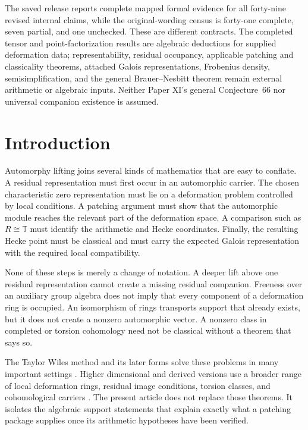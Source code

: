\documentclass[11pt]{amsart}
\theoremstyle{definition}
\theoremstyle{remark}
\newcommand{\TT}{\mathbb T}
\begin{document}
The saved release reports complete mapped formal evidence for all forty-nine revised internal claims, while the original-wording census is forty-one complete, seven partial, and one unchecked. These are different contracts. The completed tensor and point-factorization results are algebraic deductions for supplied deformation data; representability, residual occupancy, applicable patching and classicality theorems, attached Galois representations, Frobenius density, semisimplification, and the general Brauer--Nesbitt theorem remain external arithmetic or algebraic inputs. Neither Paper XI's general Conjecture~66 nor universal companion existence is assumed.

\section{Introduction}\label{sec:introduction}

Automorphy lifting joins several kinds of mathematics that are easy to conflate. A residual representation must first occur in an automorphic carrier. The chosen characteristic zero representation must lie on a deformation problem controlled by local conditions. A patching argument must show that the automorphic module reaches the relevant part of the deformation space. A comparison such as \(R\cong\TT\) must identify the arithmetic and Hecke coordinates. Finally, the resulting Hecke point must be classical and must carry the expected Galois representation with the required local compatibility.

None of these steps is merely a change of notation. A deeper lift above one residual representation cannot create a missing residual companion. Freeness over an auxiliary group algebra does not imply that every component of a deformation ring is occupied. An isomorphism of rings transports support that already exists, but it does not create a nonzero automorphic vector. A nonzero class in completed or torsion cohomology need not be classical without a theorem that says so.

The Taylor Wiles method and its later forms solve these problems in many important settings \cite{Wiles1995,TaylorWiles1995,Diamond1997,Kisin2009,Gee2022}. Higher dimensional and derived versions use a broader range of local deformation rings, residual image conditions, torsion classes, and cohomological carriers \cite{ClozelHarrisTaylor2008,BarnetLambGeeGeraghtyTaylor2014,CalegariGeraghty2018,Thorne2012,MiagkovThorne2023,Scholze2015,CaraianiScholze2017,NewtonThorne2016}. The present article does not replace those theorems. It isolates the algebraic support statements that explain exactly what a patching package supplies once its arithmetic hypotheses have been verified.
\end{document}
